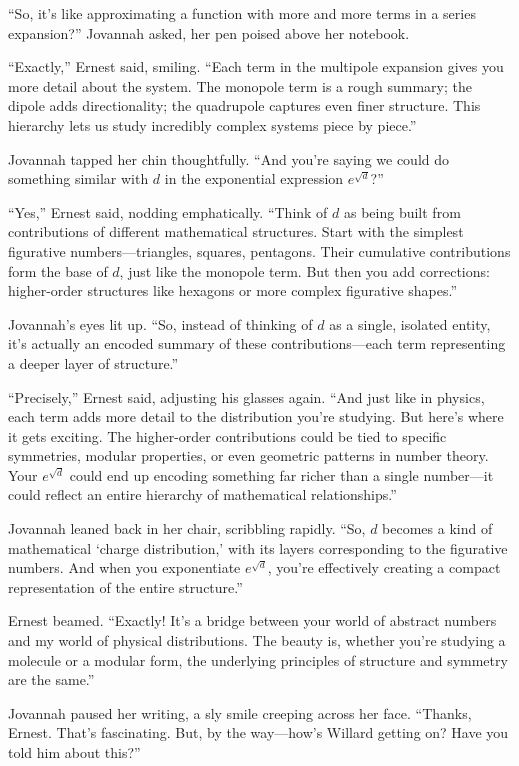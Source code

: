 “So, it’s like approximating a function with more and more terms in a series expansion?” Jovannah asked, her pen poised above her notebook.

“Exactly,” Ernest said, smiling. “Each term in the multipole expansion gives you more detail about the system. The monopole term is a rough summary; the dipole adds directionality; the quadrupole captures even finer structure. This hierarchy lets us study incredibly complex systems piece by piece.”

Jovannah tapped her chin thoughtfully. “And you’re saying we could do something similar with \(d\) in the exponential expression \(e^{\sqrt{d}}\)?”

“Yes,” Ernest said, nodding emphatically. “Think of \(d\) as being built from contributions of different mathematical structures. Start with the simplest figurative numbers—triangles, squares, pentagons. Their cumulative contributions form the base of \(d\), just like the monopole term. But then you add corrections: higher-order structures like hexagons or more complex figurative shapes.”

Jovannah’s eyes lit up. “So, instead of thinking of \(d\) as a single, isolated entity, it’s actually an encoded summary of these contributions—each term representing a deeper layer of structure.”

“Precisely,” Ernest said, adjusting his glasses again. “And just like in physics, each term adds more detail to the distribution you’re studying. But here’s where it gets exciting. The higher-order contributions could be tied to specific symmetries, modular properties, or even geometric patterns in number theory. Your \(e^{\sqrt{d}}\) could end up encoding something far richer than a single number—it could reflect an entire hierarchy of mathematical relationships.”

Jovannah leaned back in her chair, scribbling rapidly. “So, \(d\) becomes a kind of mathematical ‘charge distribution,’ with its layers corresponding to the figurative numbers. And when you exponentiate \(e^{\sqrt{d}}\), you’re effectively creating a compact representation of the entire structure.”

Ernest beamed. “Exactly! It’s a bridge between your world of abstract numbers and my world of physical distributions. The beauty is, whether you’re studying a molecule or a modular form, the underlying principles of structure and symmetry are the same.”

Jovannah paused her writing, a sly smile creeping across her face. “Thanks, Ernest. That’s fascinating. But, by the way—how’s Willard getting on? Have you told him about this?”

